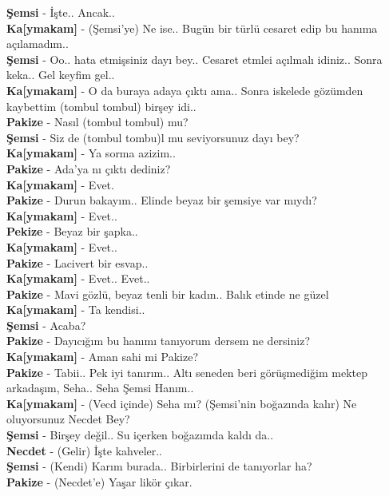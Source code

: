 \documentclass[]{book}
\begin{document}
\textbf{Şemsi} - İşte.. Ancak..\\
\textbf{Ka{[}ymakam{]}} - (Şemsi'ye) Ne ise.. Bugün bir türlü cesaret edip bu hanıma açılamadım..\\
\textbf{Şemsi} - Oo.. hata etmişsiniz dayı bey.. Cesaret etmlei açılmalı idiniz.. Sonra keka.. Gel keyfim gel..\\
\textbf{Ka{[}ymakam{]}} - O da buraya adaya çıktı ama.. Sonra iskelede gözümden kaybettim (tombul tombul) birşey idi..\\
\textbf{Pakize} - Nasıl (tombul tombul) mu?\\
\textbf{Şemsi} - Siz de (tombul tombu)l mu seviyorsunuz dayı bey?\\
\textbf{Ka{[}ymakam{]}} - Ya sorma azizim..\\
\textbf{Pakize} - Ada'ya nı çıktı dediniz?\\
\textbf{Ka{[}ymakam{]}} - Evet.\\
\textbf{Pakize} - Durun bakayım.. Elinde beyaz bir şemsiye var mıydı?\\
\textbf{Ka{[}ymakam{]}} - Evet..\\
\textbf{Pekize} - Beyaz bir şapka..\\
\textbf{Ka{[}ymakam{]}} - Evet..\\
\textbf{Pakize} - Lacivert bir esvap..\\
\textbf{Ka{[}ymakam{]}} - Evet.. Evet..\\
\textbf{Pakize} - Mavi gözlü, beyaz tenli bir kadın.. Balık etinde ne güzel\\
\textbf{Ka{[}ymakam{]}} - Ta kendisi..\\
\textbf{Şemsi} - Acaba?\\
\textbf{Pakize} - Dayıcığım bu hanımı tanıyorum dersem ne dersiniz?\\
\textbf{Ka{[}ymakam{]}} - Aman sahi mi Pakize?\\
\textbf{Pakize} - Tabii.. Pek iyi tanırım.. Altı seneden beri görüşmediğim mektep arkadaşım, Seha.. Seha Şemsi Hanım..\\
\textbf{Ka{[}ymakam{]}} - (Vecd içinde)
Seha mı? (Şemsi'nin boğazında kalır) Ne oluyorsunuz Necdet Bey?\\
\textbf{Şemsi} - Birşey değil.. Su içerken boğazımda kaldı da..\\
\textbf{Necdet} - (Gelir) İşte kahveler..\\
\textbf{Şemsi} - (Kendi) Karım burada.. Birbirlerini de tanıyorlar ha?\\
\textbf{Pakize} - (Necdet'e) Yaşar likör çıkar.\\
\end{document}
